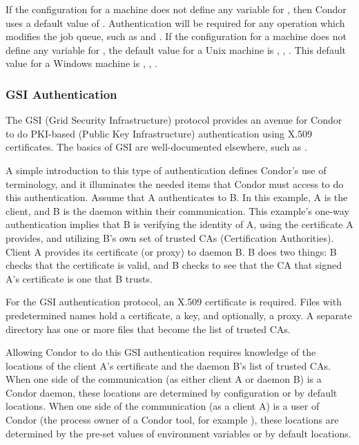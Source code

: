 If the configuration for a machine does not define any variable
for ,
then Condor uses a default value of \verb@OPTIONAL@.
Authentication will be required for
any operation which modifies the job queue,
such as  and .
If the configuration for a machine does not define any variable
for ,
the default value for a Unix machine is \verb@FS@, \verb@KERBEROS@,
\verb@GSI@. 
This default value for a Windows machine is
\verb@NTSSPI@, \verb@KERBEROS@, \verb@GSI@. 

\subsubsection{\label{sec:GSI-Authentication}GSI Authentication}
The GSI (Grid Security Infrastructure) protocol provides
an avenue for Condor to do
PKI-based (Public Key Infrastructure) authentication using X.509
certificates. 
The basics of GSI are well-documented elsewhere, such as
. 

A simple introduction to this type of authentication
defines Condor's use of terminology,
and it illuminates the needed items that Condor must access to
do this authentication.
Assume that 
A authenticates to B.
In this example, A is the client, and B is the daemon within
their communication.
This example's one-way authentication implies that B
is verifying the identity of A,
using the certificate A provides,
and utilizing B's own set of trusted CAs (Certification Authorities).
Client A provides its certificate (or proxy) to daemon B.
B does two things:
B checks that the certificate is valid,
and B checks to see that the CA that signed A's certificate
is one that B trusts.

For the GSI authentication protocol,
an X.509 certificate is required.
Files with predetermined names hold a certificate,
a key, and optionally, a proxy.
A separate directory has one or more files that become the list of
trusted CAs.

Allowing Condor to do this GSI authentication
requires knowledge of the locations of
the client A's certificate and the daemon B's list of
trusted CAs.
When one side of the communication (as either client A or daemon B)
is a Condor daemon, these locations are determined
by configuration or by default locations.
When one side of the communication (as a client A)
is a user of Condor (the process owner of a Condor tool,
for example ), these locations are determined by the
pre-set values of environment variables or by default locations.

